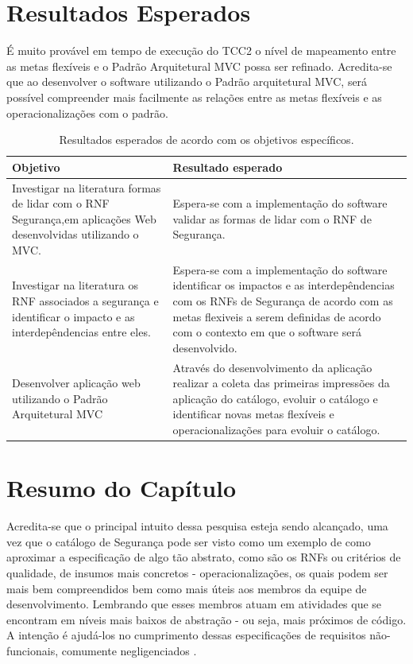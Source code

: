 \section{Resultados Esperados}
\label{sec:resultadosEsperados}

É muito provável em tempo de execução do TCC2 o nível de mapeamento entre as metas flexíveis e o  Padrão Arquitetural MVC possa ser refinado. Acredita-se que ao desenvolver o software utilizando o Padrão arquitetural MVC, será possível compreender mais facilmente as relações entre as metas flexíveis e as operacionalizações com o padrão. 


\begin{table}[h!]
	\centering
	\caption{Resultados esperados de acordo com os objetivos específicos.}
	\label{resultadosEsperados}
	\tiny
	\begin{tabular}{@{}p{8cm}p{7.5cm}@{}}
		\toprule
		\textbf{Objetivo} & \textbf{Resultado esperado} \\ \midrule
		Investigar na literatura formas de lidar com o RNF Segurança,em aplicações Web desenvolvidas utilizando o MVC. & Espera-se com a implementação do software validar as formas de lidar com o RNF de Segurança. \\
		\rowcolor[HTML]{C0C0C0} 
		Investigar na literatura os RNF associados a segurança e identificar o impacto e as interdepêndencias entre eles. & Espera-se com a implementação do software identificar os impactos e as interdepêndencias com os RNFs de Segurança de acordo com as metas flexiveis a serem definidas de acordo com o contexto em que o software será desenvolvido. \\
		Desenvolver aplicação web utilizando o Padrão Arquitetural MVC & Através do desenvolvimento da aplicação realizar a coleta das primeiras impressões da aplicação do catálogo, evoluir o catálogo e identificar novas metas flexíveis e operacionalizações para evoluir o catálogo. \\ \bottomrule
	\end{tabular}
\end{table}

\section{Resumo do Capítulo}

Acredita-se que o principal intuito dessa pesquisa esteja sendo alcançado, uma vez que o catálogo de Segurança pode ser visto como um exemplo de como aproximar a especificação de algo tão abstrato, como são os RNFs ou critérios de qualidade, de insumos mais concretos - operacionalizações, os quais podem ser mais bem compreendidos bem como mais úteis aos membros da equipe de desenvolvimento. Lembrando que esses membros atuam em atividades que se encontram em níveis mais baixos de abstração - ou seja, mais próximos de código. A intenção é ajudá-los no cumprimento dessas especificações de requisitos não-funcionais, comumente negligenciados \cite{eckhardt2016non}.
